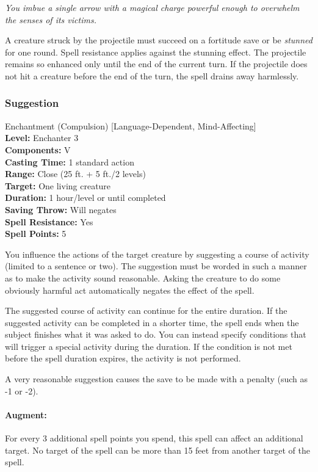\emph{You imbue a single arrow with a magical charge powerful enough to overwhelm the senses of its victims.}

A creature struck by the projectile must succeed on a fortitude save or be \emph{stunned} for one round.
Spell resistance applies against the stunning effect.
The projectile remains so enhanced only until the end of the current turn. 
If the projectile does not hit a creature before the end of the turn, the spell drains away harmlessly.
\subsubsection{Suggestion}
\label{Spell:Suggestion}
Enchantment (Compulsion) [Language-Dependent, Mind-Affecting]
\\ \textbf{Level:} Enchanter 3
\\ \textbf{Components:} V
\\ \textbf{Casting Time:} 1 standard action
\\ \textbf{Range:} Close (25 ft. + 5 ft./2 levels)
\\ \textbf{Target:} One living creature
\\ \textbf{Duration:} 1 hour/level or until completed
\\ \textbf{Saving Throw:} Will negates
\\ \textbf{Spell Resistance:} Yes
\\ \textbf{Spell Points:} 5

You influence the actions of the target creature by suggesting a course of activity (limited to a sentence or two). 
The suggestion must be worded in such a manner as to make the activity sound reasonable. 
Asking the creature to do some obviously harmful act automatically negates the effect of the spell.

The suggested course of activity can continue for the entire duration. 
If the suggested activity can be completed in a shorter time, the spell ends when the subject finishes what it was asked to do. 
You can instead specify conditions that will trigger a special activity during the duration. 
If the condition is not met before the spell duration expires, the activity is not performed.

A very reasonable suggestion causes the save to be made with a penalty (such as -1 or -2).

\paragraph{Augment:}
For every 3 additional spell points you spend, this spell can affect an additional target.%
No target of the spell can be more than 15 feet from another target of the spell.

